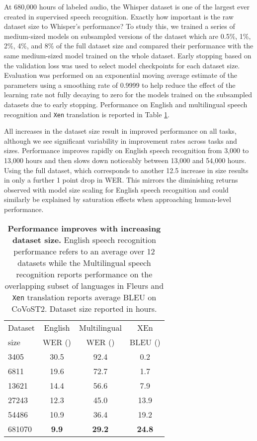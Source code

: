 \documentclass[nohyperref]{article}
\theoremstyle{plain}
\theoremstyle{definition}
\theoremstyle{remark}
\begin{document}
At 680,000 hours of labeled audio, the Whisper dataset is one of the largest ever created in supervised speech recognition. Exactly how important is the raw dataset size to Whisper's performance? To study this, we trained a series of medium-sized models on subsampled versions of the dataset which are 0.5\%, 1\%, 2\%, 4\%, and 8\% of the full dataset size and compared their performance with the same medium-sized model trained on the whole dataset. Early stopping based on the validation loss was used to select model checkpoints for each dataset size. Evaluation was performed on an exponential moving average estimate of the parameters \cite{polyak1992acceleration} using a smoothing rate of 0.9999 to help reduce the effect of the learning rate not fully decaying to zero for the models trained on the subsampled datasets due to early stopping. Performance on English and multilingual speech recognition and \texttt{Xen} translation is reported in Table \ref{dataset_scaling_table}.

All increases in the dataset size result in improved performance on all tasks, although we see significant variability in improvement rates across tasks and sizes. Performance improves rapidly on English speech recognition from 3,000 to 13,000 hours and then slows down noticeably between 13,000 and 54,000 hours. Using the full dataset, which corresponds to another 12.5 increase in size results in only a further 1 point drop in WER. This mirrors the diminishing returns observed with model size scaling for English speech recognition and could similarly be explained by saturation effects when approaching human-level performance.

\begin{table}[t]
\vskip 0.15in
\begin{center}
\begin{tabular}{l|ccc}
\toprule
 Dataset & English & Multilingual & XEn \\
 size & WER () & WER () & BLEU () \\
\midrule
3405 & 30.5 & 92.4 & 0.2 \\
6811 & 19.6 & 72.7 & 1.7 \\
13621 & 14.4 & 56.6 & 7.9 \\
27243 & 12.3 & 45.0 & 13.9 \\
54486 & 10.9 & 36.4 & 19.2 \\
681070 & \textbf{9.9} & \textbf{29.2} & \textbf{24.8} \\
\bottomrule
\end{tabular}
\caption{\textbf{Performance improves with increasing dataset size. } English speech recognition performance refers to an average over 12 datasets while the Multilingual speech recognition reports performance on the overlapping subset of languages in Fleurs and \texttt{Xen} translation reports average BLEU on CoVoST2. Dataset size reported in hours.}
\label{dataset_scaling_table}
\end{center}
\vspace{-1em}
\end{table}
\end{document}
